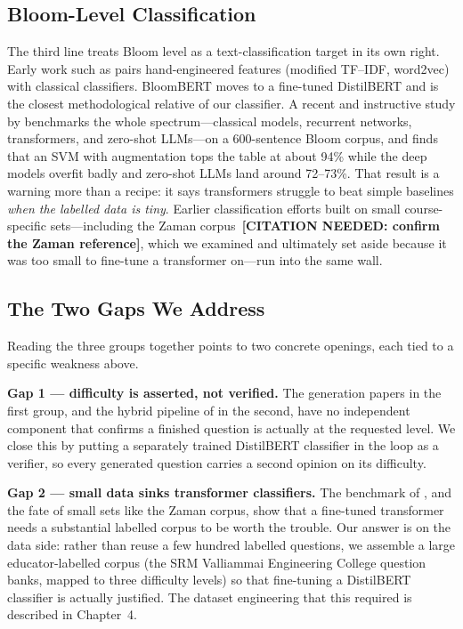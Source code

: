 \documentclass[12pt,a4paper]{report}
\begin{document}
\subsection{Bloom-Level Classification}
The third line treats Bloom level as a text-classification target in its own
right. Early work such as \textcite{mohammed2020question} pairs hand-engineered
features (modified TF--IDF, word2vec) with classical classifiers. BloomBERT
\parencite{lau2022bloombert} moves to a fine-tuned DistilBERT and is the closest
methodological relative of our classifier. A recent and instructive study by
\textcite{kumar2025automated} benchmarks the whole spectrum---classical models,
recurrent networks, transformers, and zero-shot LLMs---on a 600-sentence Bloom
corpus, and finds that an SVM with augmentation tops the table at about 94\%
while the deep models overfit badly and zero-shot LLMs land around 72--73\%.
That result is a warning more than a recipe: it says transformers struggle to
beat simple baselines \emph{when the labelled data is tiny}. Earlier
classification efforts built on small course-specific sets---including the Zaman
corpus \parencite{zamanPLACEHOLDER}\,\textbf{[CITATION NEEDED: confirm the Zaman
reference]}, which we examined and ultimately set aside because it was too small
to fine-tune a transformer on---run into the same wall.

\subsection{The Two Gaps We Address}
Reading the three groups together points to two concrete openings, each tied to a
specific weakness above.

\textbf{Gap 1 --- difficulty is asserted, not verified.} The generation papers in
the first group, and the hybrid pipeline of \textcite{maity2025icl} in the
second, have no independent component that confirms a finished question is
actually at the requested level. We close this by putting a separately trained
DistilBERT classifier in the loop as a verifier, so every generated question
carries a second opinion on its difficulty.

\textbf{Gap 2 --- small data sinks transformer classifiers.} The benchmark of
\textcite{kumar2025automated}, and the fate of small sets like the Zaman corpus,
show that a fine-tuned transformer needs a substantial labelled corpus to be
worth the trouble. Our answer is on the data side: rather than reuse a few
hundred labelled questions, we assemble a large educator-labelled corpus (the SRM
Valliammai Engineering College question banks, mapped to three difficulty levels)
so that fine-tuning a DistilBERT classifier is actually justified. The dataset
engineering that this required is described in Chapter~4.
\end{document}
